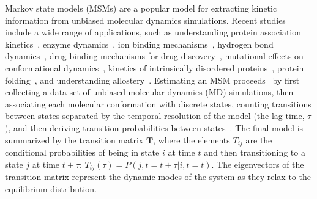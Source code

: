 \documentclass[journal=jacsat,manuscript=article]{achemso}
\begin{document}
Markov state models (MSMs) are a popular model for extracting kinetic information from unbiased molecular dynamics simulations. Recent studies include a wide range of applications, such as understanding protein association kinetics~\cite{cannariato_prediction_2022, chakrabarti_litmus_2022}, enzyme dynamics~\cite{koulgi_structural_2021}, ion binding mechanisms~\cite{dutta_distinct_2022, mckiernan_dynamical_2020}, hydrogen bond dynamics~\cite{ibrahim_dynamics_2022}, drug binding mechanisms for drug discovery~\cite{hu_discovery_2022, pantsar_decisive_2022, hempel_molecular_2021, tosstorff_study_2020, liu_silico_2021}, mutational effects on conformational dynamics~\cite{fernandez-quintero_mutation_2021, sharma_comparative_2020, juarez-jimenezDynamicDesignManipulation2020b, wapeesittipanAllostericEffectsCyclophilin2019a}, kinetics of intrinsically disordered proteins~\cite{paul_diversity_2020}, protein folding~\cite{zhou_molecular_2021}, and understanding allostery~\cite{tian_deciphering_2020, bowman_msmallosteric_2015, pontiggia_msmcprotein_2015}. Estimating an MSM proceeds~\cite{noe_markov_2019} by first collecting a data set of unbiased molecular dynamics (MD) simulations, then associating each molecular conformation with discrete states, counting transitions between states separated by the temporal resolution of the model (the lag time, $\tau$), and then deriving transition probabilities between states~\cite{trendelkamp-schroer_estimation_2015}. The final model is summarized by the transition matrix $\mathbf{T}$, where the elements $T_{ij}$ are the conditional probabilities of being in state $i$ at time $t$ and then transitioning to a state $j$ at time $t{+}\tau$: $T_{ij}(\tau){=}P(j, t{=}t{+}\tau| i, t{=}t)$.  The eigenvectors of the transition matrix represent the dynamic modes of the system as they relax to the equilibrium distribution. 
\end{document}
